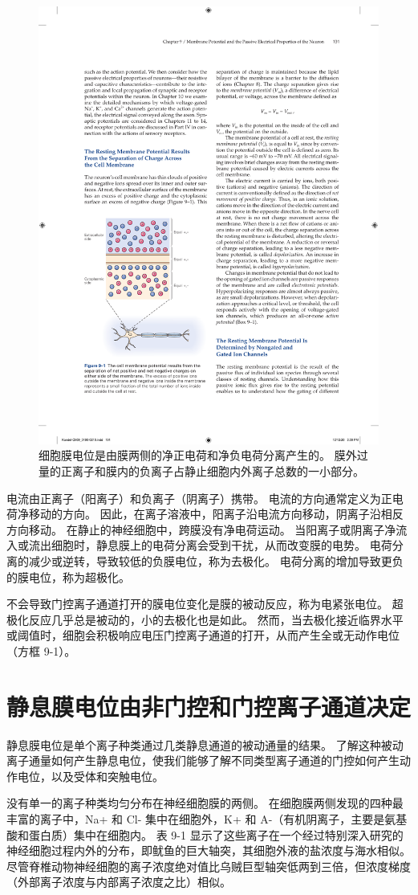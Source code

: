 \begin{figure}[htbp]
	\centering
	\includegraphics[width=0.5\linewidth]{chap09/fig_9_1}
	\caption{细胞膜电位是由膜两侧的净正电荷和净负电荷分离产生的。 膜外过量的正离子和膜内的负离子占静止细胞内外离子总数的一小部分。}
	\label{fig:9_1}
\end{figure}


电流由正离子（阳离子）和负离子（阴离子）携带。 
电流的方向通常定义为正电荷净移动的方向。 
因此，在离子溶液中，阳离子沿电流方向移动，阴离子沿相反方向移动。 
在静止的神经细胞中，跨膜没有净电荷运动。 
当阳离子或阴离子净流入或流出细胞时，静息膜上的电荷分离会受到干扰，从而改变膜的电势。 
电荷分离的减少或逆转，导致较低的负膜电位，称为去极化。 
电荷分离的增加导致更负的膜电位，称为超极化。


不会导致门控离子通道打开的膜电位变化是膜的被动反应，称为电紧张电位。 
超极化反应几乎总是被动的，小的去极化也是如此。 
然而，当去极化接近临界水平或阈值时，细胞会积极响应电压门控离子通道的打开，从而产生全或无动作电位（方框 9-1）。



\section{静息膜电位由非门控和门控离子通道决定}
静息膜电位是单个离子种类通过几类静息通道的被动通量的结果。 
了解这种被动离子通量如何产生静息电位，使我们能够了解不同类型离子通道的门控如何产生动作电位，以及受体和突触电位。


没有单一的离子种类均匀分布在神经细胞膜的两侧。 
在细胞膜两侧发现的四种最丰富的离子中，Na+ 和 Cl- 集中在细胞外，K+ 和 A-（有机阴离子，主要是氨基酸和蛋白质）集中在细胞内。 
表 9-1 显示了这些离子在一个经过特别深入研究的神经细胞过程内外的分布，即鱿鱼的巨大轴突，其细胞外液的盐浓度与海水相似。 
尽管脊椎动物神经细胞的离子浓度绝对值比乌贼巨型轴突低两到三倍，但浓度梯度（外部离子浓度与内部离子浓度之比）相似。


